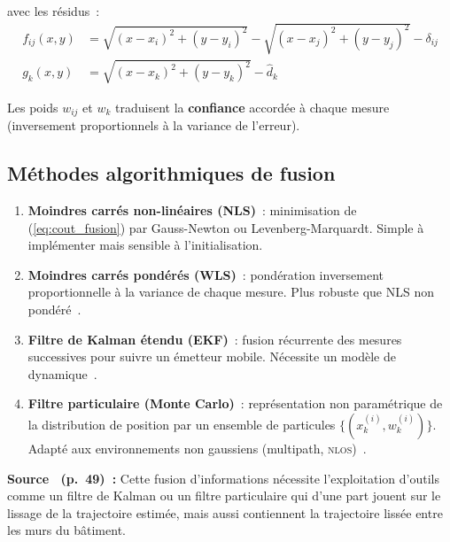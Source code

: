 \documentclass[12pt, a4paper]{article}
\newcommand{\NLOS}{\textsc{nlos}}
\begin{document}
avec les résidus~:
\begin{align}
  f_{ij}(x,y) &= \sqrt{(x-x_i)^2+(y-y_i)^2} - \sqrt{(x-x_j)^2+(y-y_j)^2}
                - \delta_{ij}
                \label{eq:residu_tdoa}\\[4pt]
  g_k(x,y) &= \sqrt{(x-x_k)^2+(y-y_k)^2} - \hat{d}_k
              \label{eq:residu_rssi}
\end{align}

Les poids $w_{ij}$ et $w_k$ traduisent la \textbf{confiance} accordée à chaque
mesure (inversement proportionnels à la variance de l'erreur).

\subsection{Méthodes algorithmiques de fusion}

\begin{enumerate}[label=\alph*)]
  \item \textbf{Moindres carrés non-linéaires (NLS)}~: minimisation de
        (\ref{eq:cout_fusion}) par Gauss-Newton ou Levenberg-Marquardt. Simple à
        implémenter mais sensible à l'initialisation.

  \item \textbf{Moindres carrés pondérés (WLS)}~: pondération inversement
        proportionnelle à la variance de chaque mesure. Plus robuste que NLS
        non pondéré~\cite{Kossonou2014}.

  \item \textbf{Filtre de Kalman étendu (EKF)}~: fusion récurrente des mesures
        successives pour suivre un émetteur mobile. Nécessite un modèle de
        dynamique~\cite{Evennou2007}.

  \item \textbf{Filtre particulaire (Monte Carlo)}~: représentation non
        paramétrique de la distribution de position par un ensemble de particules
        $\{(x_k^{(i)}, w_k^{(i)})\}$. Adapté aux environnements non gaussiens
        (multipath, \NLOS{})~\cite{Klingbeil2008}.
\end{enumerate}

\begin{citebox}
\textbf{Source~\cite{Evennou2007} (p.~49)~:} \og{}Cette fusion d'informations
nécessite l'exploitation d'outils comme un filtre de Kalman ou un filtre particulaire
qui d'une part jouent sur le lissage de la trajectoire estimée, mais aussi contiennent
la trajectoire lissée entre les murs du bâtiment.\fg{}
\end{citebox}
\end{document}
